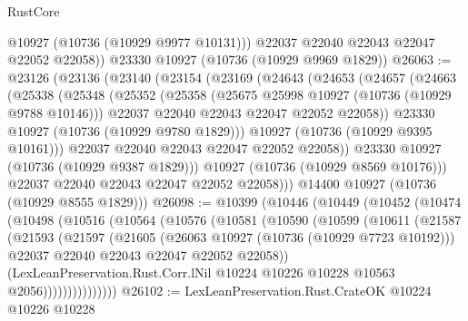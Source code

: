 \begin{lexlean}{RustCore}
\begin{coremodule}
          @10927
          (@10736 (@10929 @9977 @10131)))
        @22037
        @22040
        @22043
        @22047
        @22052
        @22058))
    @23330
    @10927
    (@10736 (@10929 @9969 @1829))
@26063 := @23126
    (@23136
      (@23140
        (@23154
          (@23169
            (@24643
              (@24653
                (@24657
                  (@24663
                    (@25338
                      (@25348
                        (@25352
                          (@25358
                            (@25675 @25998 @10927 (@10736 (@10929 @9788 @10146)))
                            @22037
                            @22040
                            @22043
                            @22047
                            @22052
                            @22058))
                        @23330
                        @10927
                        (@10736 (@10929 @9780 @1829)))
                      @10927
                      (@10736 (@10929 @9395 @10161)))
                    @22037
                    @22040
                    @22043
                    @22047
                    @22052
                    @22058))
                @23330
                @10927
                (@10736 (@10929 @9387 @1829)))
              @10927
              (@10736 (@10929 @8569 @10176)))
            @22037
            @22040
            @22043
            @22047
            @22052
            @22058)))
      @14400
      @10927
      (@10736 (@10929 @8555 @1829)))
@26098 := @10399
    (@10446
      (@10449
        (@10452
          (@10474
            (@10498
              (@10516
                (@10564
                  (@10576
                    (@10581
                      (@10590
                        (@10599
                          (@10611
                            (@21587
                              (@21593
                                (@21597
                                  (@21605
                                    (@26063 @10927 (@10736 (@10929 @7723 @10192)))
                                    @22037
                                    @22040
                                    @22043
                                    @22047
                                    @22052
                                    @22058))
                                (LexLeanPreservation.Rust.Corr.lNil
                                  @10224
                                  @10226
                                  @10228
                                  @10563
                                  @2056)))))))))))))))
@26102 := LexLeanPreservation.Rust.CrateOK @10224 @10226 @10228

\end{coremodule}
\end{lexlean}
